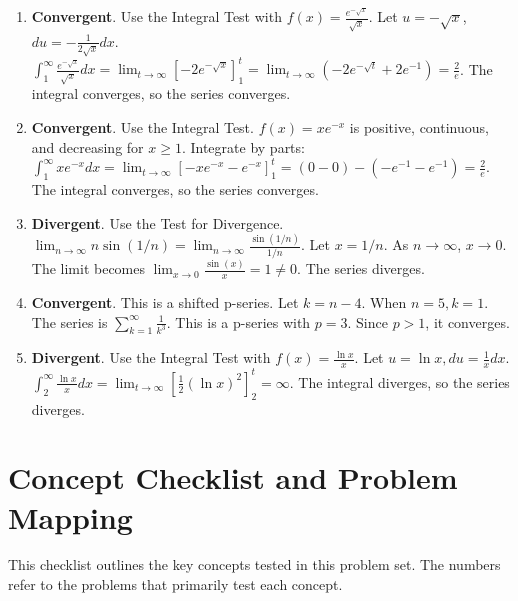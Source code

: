 \documentclass[12pt]{article}
\begin{document}
\begin{enumerate}
    \item \textbf{Convergent}. Use the Integral Test with $f(x) = \frac{e^{-\sqrt{x}}}{\sqrt{x}}$. Let $u = -\sqrt{x}$, $du = -\frac{1}{2\sqrt{x}}dx$.
    $\int_1^\infty \frac{e^{-\sqrt{x}}}{\sqrt{x}} dx = \lim_{t\to\infty} [-2e^{-\sqrt{x}}]_1^t = \lim_{t\to\infty} (-2e^{-\sqrt{t}} + 2e^{-1}) = \frac{2}{e}$. The integral converges, so the series converges.
    
    \item \textbf{Convergent}. Use the Integral Test. $f(x)=xe^{-x}$ is positive, continuous, and decreasing for $x \ge 1$. Integrate by parts: $\int_1^\infty xe^{-x} dx = \lim_{t\to\infty} [-xe^{-x} - e^{-x}]_1^t = (0-0) - (-e^{-1}-e^{-1}) = \frac{2}{e}$. The integral converges, so the series converges.
    
    \item \textbf{Divergent}. Use the Test for Divergence. $\lim_{n\to\infty} n \sin(1/n) = \lim_{n\to\infty} \frac{\sin(1/n)}{1/n}$. Let $x=1/n$. As $n\to\infty$, $x\to 0$. The limit becomes $\lim_{x\to 0} \frac{\sin(x)}{x} = 1 \neq 0$. The series diverges.
    
    \item \textbf{Convergent}. This is a shifted p-series. Let $k = n-4$. When $n=5, k=1$. The series is $\sum_{k=1}^\infty \frac{1}{k^3}$. This is a p-series with $p=3$. Since $p>1$, it converges.
    
    \item \textbf{Divergent}. Use the Integral Test with $f(x)=\frac{\ln x}{x}$. Let $u=\ln x, du = \frac{1}{x}dx$. $\int_2^\infty \frac{\ln x}{x} dx = \lim_{t\to\infty} [\frac{1}{2}(\ln x)^2]_2^t = \infty$. The integral diverges, so the series diverges.
\end{enumerate}

\newpage
\section*{Concept Checklist and Problem Mapping}
This checklist outlines the key concepts tested in this problem set. The numbers refer to the problems that primarily test each concept.
\end{document}
